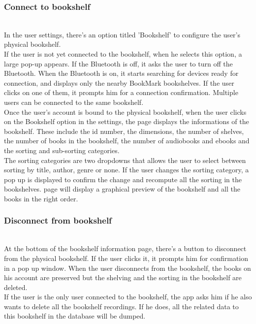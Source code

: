 \documentclass[conference]{IEEEtran}
\begin{document}
\subsubsection{Connect to bookshelf}\hfill\\
In the user settings, there's an option titled 'Bookshelf' to configure the user's physical bookshelf.\\
If the user is not yet connected to the bookshelf, when he selects this option, a large pop-up appears. If the Bluetooth is off, it asks the user to turn off the Bluetooth. When the Bluetooth is on, it starts searching for devices ready for connection, and displays only the nearby BookMark bookshelves. If the user clicks on one of them, it prompts him for a connection confirmation. Multiple users can be connected to the same bookshelf.\\
Once the user's account is bound to the physical bookshelf, when the user clicks on the Bookshelf option in the settings, the page displays the informations of the bookshelf. These include the id number, the dimensions, the number of shelves, the number of books in the bookshelf, the number of audiobooks and ebooks and the sorting and sub-sorting categories.\\
The sorting categories are two dropdowns that allows the user to select between sorting by title, author, genre or none. If the user changes the sorting category, a pop up is displayed to confirm the change and recompute all the sorting in the bookshelves. page will display a graphical preview of the bookshelf and all the books in the right order.\\

\subsubsection{Disconnect from bookshelf}\hfill\\
At the bottom of the bookshelf information page, there's a button to disconnect from the physical bookshelf. If the user clicks it, it prompts him for confirmation in a pop up window. When the user disconnects from the bookshelf, the books on his account are preserved but the shelving and the sorting in the bookshelf are deleted.\\
If the user is the only user connected to the bookshelf, the app asks him if he also wants to delete all the bookshelf recordings. If he does, all the related data to this bookshelf in the database will be dumped.\\
\end{document}
